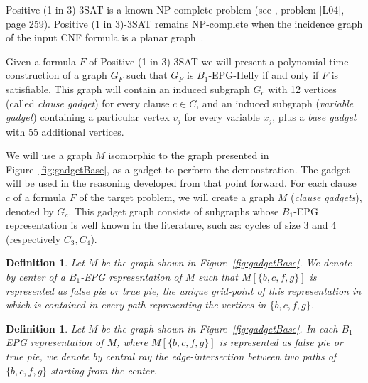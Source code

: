 \documentclass[a4paper,11pt]{article}
\newtheorem{defi}[theorem]{Definition}
\begin{document}
{\sc Positive (1 in 3)-3SAT } is a known NP-complete problem (see \citep{johnson1979}, problem [L04], page 259). {\sc Positive (1 in 3)-3SAT} remains NP-complete when the incidence graph of the input CNF formula is a planar graph~\citep{mulzer2008minimum}.

Given a formula $F$ of {\sc Positive (1 in 3)-3SAT} we will present a polynomial-time construction of a graph $ G_F$ such that $ G_F $ is $ B_1$-EPG-Helly if and only if $ F $ is satisfiable. This graph will contain an induced subgraph $ G_c$ with 12 vertices (called \emph {clause gadget}) for every clause $ c \in C $, and an induced subgraph (\emph {variable gadget}) containing a particular vertex  $ v_j$ for every variable $ x_j$, plus a \emph{base gadget}  with 55 additional vertices.

We will use a graph $M$ isomorphic to the graph presented in Figure~\ref{fig:gadgetBase}, as a gadget to perform the demonstration. The gadget will be used in the reasoning developed from that point forward. For each  clause $c$ of a formula $F$ of the target problem, we will create a  graph $M$ (\emph{clause gadgets}), denoted by $G_c$. This gadget graph consists of subgraphs whose $B_1$-EPG representation is well known in the literature, such as: cycles of size 3 and 4 (respectively $ C_3, C_4 $).

 


\begin{defi}
\label{lab:lab1}
Let $M$ be the graph shown in Figure~\ref{fig:gadgetBase}. We denote by \emph{center} of a $B_1$-EPG representation of $M$ such that $M[\{b, c, f, g \}]$ is represented as false pie or true pie, the unique grid-point of this representation in which is contained in every path representing the vertices in $ \{b, c, f, g \}$.
\end{defi}

\begin{defi}\citep{golumbic2009}
Let $M$ be the graph shown in Figure~\ref{fig:gadgetBase}. In each $B_1$-EPG representation of $M$, where $M[\{b, c, f, g \}]$ is represented as false pie or true pie, we denote by \emph {central ray} the edge-intersection  between two paths of $ \{b, c, f, g \} $ starting from the center.
\end{defi}
\end{document}
